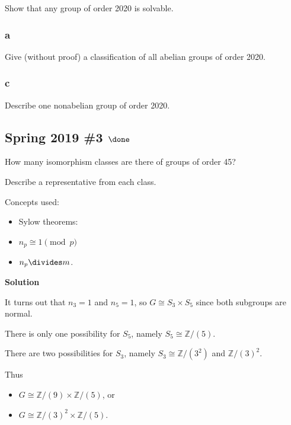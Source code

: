 Show that any group of order 2020 is solvable.

\hypertarget{a-20}{%
\subsubsection{a}\label{a-20}}

Give (without proof) a classification of all abelian groups of order
2020.

\hypertarget{c-12}{%
\subsubsection{c}\label{c-12}}

Describe one nonabelian group of order 2020.


\hypertarget{spring-2019-3-done}{%
\subsection{\texorpdfstring{Spring 2019 \#3
\(\done\)}{Spring 2019 \#3 \textbackslash done}}\label{spring-2019-3-done}}

How many isomorphism classes are there of groups of order 45?

Describe a representative from each class.

\begin{solution}

Concepts used:

\begin{itemize}
\tightlist
\item
  Sylow theorems:
\item
  \(n_p \cong 1 \pmod p\)
\item
  \(n_p \divides m\).
\end{itemize}

\textbf{Solution}

It turns out that \(n_3 = 1\) and \(n_5 = 1\), so
\(G \cong S_3 \times S_5\) since both subgroups are normal.

There is only one possibility for \(S_5\), namely
\(S_5\cong {\mathbb{Z}}/(5)\).

There are two possibilities for \(S_3\), namely
\(S_3 \cong {\mathbb{Z}}/(3^2)\) and \({\mathbb{Z}}/(3)^2\).

Thus

\begin{itemize}
\tightlist
\item
  \(G \cong {\mathbb{Z}}/(9) \times{\mathbb{Z}}/(5)\), or
\item
  \(G \cong {\mathbb{Z}}/(3)^2 \times{\mathbb{Z}}/(5)\).
\end{itemize}


\end{solution}

